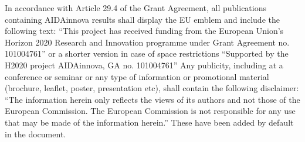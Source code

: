 In accordance with Article 29.4 of the Grant Agreement, all publications containing AIDAinnova results shall display the EU emblem and include the following text: ``This project has received funding from the European Union's Horizon 2020 Research and Innovation programme under Grant Agreement no. 101004761'' or a shorter version in case of space restrictions ``Supported by the H2020 project AIDAinnova, GA no. 101004761'' Any publicity, including at a conference or seminar or any type of information or promotional material (brochure, leaflet, poster, presentation etc), shall contain the following disclaimer: ``The information herein only reflects the views of its authors and not those of the European Commission. The European Commission is not responsible for any use that may be made of the information herein.'' These have been added by default in the document.

